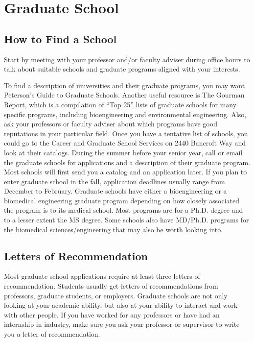 \chapter*{Graduate School}

\section*{How to Find a School}

Start by meeting with your professor and/or faculty adviser during office hours to talk about suitable schools and graduate programs aligned with your interests.

To find a description of universities and their graduate programs, you may want Peterson’s Guide to Graduate Schools. Another useful resource is The Gourman Report, which is a compilation of “Top 25” lists of graduate schools for many specific programs, including bioengineering and environmental engineering. Also, ask your professors or faculty adviser about which programs have good reputations in your particular field. Once you have a tentative list of schools, you could go to the Career and Graduate School Services on 2440 Bancroft Way and look at their catalogs. During the summer before your senior year, call or email the graduate schools for applications and a description of their graduate program. Most schools will first send you a catalog and an application later. If you plan to enter graduate school in the fall, application deadlines usually range from December to February. Graduate schools have either a bioengineering or a biomedical engineering graduate program depending on how closely associated the program is to its medical school. Most programs are for a Ph.D. degree and to a lesser extent the MS degree. Some schools also have MD/Ph.D. programs for the biomedical sciences/engineering that may also be worth looking into.

\section*{Letters of Recommendation}

Most graduate school applications require at least three letters of recommendation. Students usually get letters of recommendations from professors, graduate students, or employers. Graduate schools are not only looking at your academic ability, but also at your ability to interact and work with other people. If you have worked for any professors or have had an internship in industry, make sure you ask your professor or supervisor to write you a letter of recommendation.

